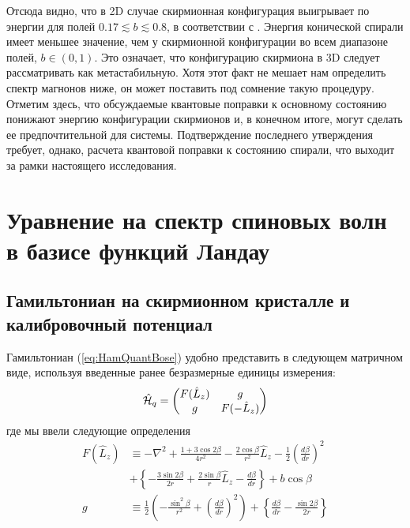 \documentclass[a4paper,article,14pt]{extarticle}
\begin{document}
Отсюда видно, что в 2D случае скирмионная конфигурация выигрывает по энергии для полей  $0.17 \lesssim b \lesssim 0.8$, в соответствии с \cite{Rybakov2015}.
Энергия конической спирали имеет меньшее значение, чем у скирмионной конфигурации во всем диапазоне полей, $b \in (0,1)$. Это означает, что конфигурацию скирмиона в 3D следует рассматривать как метастабильную. Хотя этот факт не мешает нам определить спектр магнонов ниже, он может поставить под сомнение такую процедуру. Отметим здесь, что обсуждаемые квантовые поправки к основному состоянию понижают энергию конфигурации скирмионов и, в конечном итоге, могут сделать ее предпочтительной для системы. Подтверждение последнего утверждения требует, однако, расчета квантовой поправки к состоянию спирали, что выходит за рамки настоящего исследования.


\pagebreak
\section{ Уравнение на спектр спиновых волн в базисе функций Ландау }

\subsection{ Гамильтониан на скирмионном кристалле и калибровочный потенциал }

Гамильтониан (\ref{eq:HamQuantBose}) удобно представить в следующем матричном виде, используя введенные ранее безразмерные единицы измерения:
\begin{equation}
\label{eq:HamQuantBoseDimensionless}
\hat {\cal H}_{q} =\begin{pmatrix} F(\hat  L_{z}) &g \\ g & F(  - \hat  L_{z} ) \end{pmatrix}
\end{equation}
где мы ввели следующие определения
$$
\begin{aligned} 
F  (\hat  L_{z} )&\equiv   - \nabla^{2}  + \frac{1 + 3\cos 2\beta }{4r^2} - \frac{2\cos \beta }{r^2}\hat{L}_{z} - \frac{1}{2}\left( \frac{d\beta }{dr} \right)^2  \\
& +  \left\{  - \frac{3\sin 2\beta }{2r} + \frac{2\sin \beta }{r}\hat{L}_{z}  - \frac{d\beta }{dr} \right\} + b\cos \beta   \\ 
g &\equiv \frac{1}{2}\left(  - \frac{\sin ^2\beta }{r^2} + \left( \frac{d\beta }{dr} \right)^2 \right) 
+ \left\{ \frac{d\beta }{dr} - \frac{\sin 2\beta }{2r} \right\}
\end{aligned}  
$$
\end{document}
